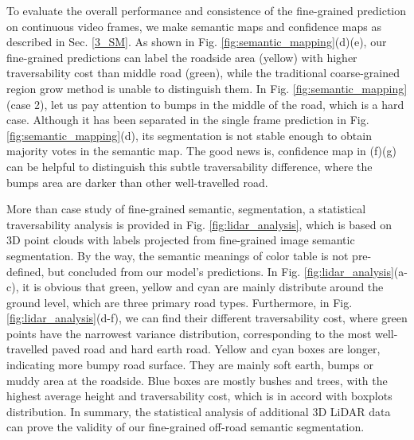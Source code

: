 \documentclass[letterpaper, 10 pt, conference]{ieeeconf}  %
\begin{document}
To evaluate the overall performance and consistence of the fine-grained prediction on continuous video frames, we make semantic maps and confidence maps as described in Sec. \ref{3_SM}. As shown in Fig. \ref{fig:semantic_mapping}(d)(e), our fine-grained predictions can label the roadside area (yellow) with higher traversability cost than middle road (green), while the traditional coarse-grained region grow method is unable to distinguish them. In Fig. \ref{fig:semantic_mapping}(case 2), let us pay attention to bumps in the middle of the road, which is a hard case. Although it has been separated in the single frame prediction in Fig. \ref{fig:semantic_mapping}(d), its segmentation is not stable enough to obtain majority votes in the semantic map. The good news is, confidence map in (f)(g) can be helpful to distinguish this subtle traversability difference, where the bumps area are darker than other well-travelled road.

More than case study of fine-grained semantic, segmentation, a statistical traversability analysis is provided in Fig. \ref{fig:lidar_analysis}, which is based on 3D point clouds with labels projected from fine-grained image semantic segmentation. By the way, the semantic meanings of color table is not pre-defined, but concluded from our model's predictions.
In Fig. \ref{fig:lidar_analysis}(a-c), it is obvious that green, yellow and cyan are mainly distribute around the ground level, which are three primary road types. Furthermore, in Fig. \ref{fig:lidar_analysis}(d-f), we can find their different traversability cost, where green points have the narrowest variance distribution, corresponding to the most well-travelled paved road and hard earth road. Yellow and cyan boxes are longer, indicating more bumpy road surface. They are mainly soft earth, bumps or muddy area at the roadside. Blue boxes are mostly bushes and trees, with the highest average height and traversability cost, which is in accord with boxplots distribution. In summary, the statistical analysis of additional 3D LiDAR data can prove the validity of our fine-grained off-road semantic segmentation.
\end{document}
